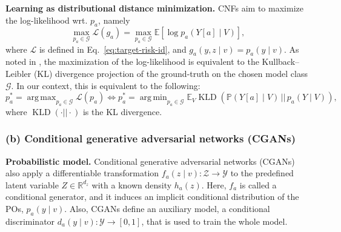 \documentclass[dvipsnames]{article} %
\DeclareMathOperator*{\argmax}{arg\,max}
\DeclareMathOperator*{\argmin}{arg\,min}
\begin{document}
\textbf{Learning as distributional distance minimization.} CNFs aim to maximize the log-likelihood wrt. $p_a$, namely
\begin{equation}
    \max_{p_a \in \mathcal{G}} \mathcal{L}(g_a) = \max_{p_a \in \mathcal{G}}\mathbb{E}\left[\log p_a(Y[a] \mid V) \right],
\end{equation}
where $\mathcal{L}$ is defined in Eq.~\eqref{eq:target-risk-id}, and $g_a(y, z \mid v) = p_a(y \mid v)$.
As noted in \citep{kennedy2023semiparametric,melnychuk2023normalizing}, the maximization of the log-likelihood is equivalent to the Kullback–Leibler (KL) divergence projection of the ground-truth on the chosen model class $\mathcal{G}$. In our context, this is equivalent to the following:
\begin{equation}
    p_a^* = \argmax_{p_a \in \mathcal{G}} \mathcal{L}(p_a) \Longleftrightarrow p_a^* = \argmin_{p_a \in \mathcal{G}} \mathbb{E}_V \operatorname{KLD}(\mathbb{P}(Y[a] \mid V)\,|| \, p_a(Y \mid V )),
\end{equation}
where $\operatorname{KLD} (\cdot || \cdot )$ is the KL divergence. 


\subsubsection{(b) Conditional generative adversarial networks (CGANs)}
\textbf{Probabilistic model.} Conditional generative adversarial networks (CGANs) \citep{goodfellow2014generative, laria2022transferring} also apply a differentiable transformation $f_a(z \mid v): \mathcal{Z} \to \mathcal{Y}$ to the predefined latent variable $Z \in \mathbb{R}^{d_z}$ with a known density $h_a(z)$. Here, $f_a$ is called a conditional generator, and it induces an implicit conditional distribution of the POs, $p_a(y \mid v)$. Also, CGANs define an auxiliary model, a conditional discriminator $d_a(y \mid v): \mathcal{Y} \to [0, 1]$, that is used to train the whole model.  
\end{document}
